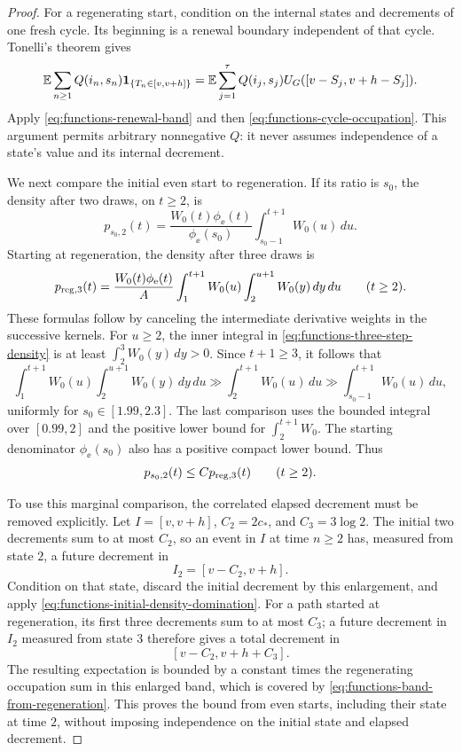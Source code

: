 \begin{proof}
For a regenerating start, condition on the internal states and
decrements of one fresh cycle.  Its beginning is a renewal boundary
independent of that cycle.  Tonelli's theorem gives
\[
 \mathbb E\sum_{n\ge1}Q(i_n,s_n)\mathbf 1_{\{T_n\in[v,v+h]\}}
 =
 \mathbb E\sum_{j=1}^{\tau}Q(i_j,s_j)
 U_G([v-S_j,v+h-S_j]).
\]
Apply \eqref{eq:functions-renewal-band} and then
\eqref{eq:functions-cycle-occupation}.
This argument permits arbitrary nonnegative \(Q\): it never
assumes independence of a state's value and its internal decrement.

We next compare the initial even start to regeneration.
If its ratio is \(s_0\), the density after two draws, on \(t\ge2\),
is
\begin{equation}\label{eq:functions-two-step-density}
 p_{s_0,2}(t)=
 \frac{W_0(t)\phi_\ee(t)}{\phi_\ee(s_0)}
 \int_{s_0-1}^{t+1}W_0(u)\,du.
\end{equation}
Starting at regeneration, the density after three draws is
\begin{equation}\label{eq:functions-three-step-density}
 p_{{\rm reg},3}(t)=
 \frac{W_0(t)\phi_\mathrm e(t)}A
 \int_1^{t+1}W_0(u)
       \int_2^{u+1}W_0(y)\,dy\,du
 \qquad(t\ge2).
\end{equation}
These formulas follow by canceling the intermediate derivative
weights in the successive kernels.
For \(u\ge2\), the inner integral in
\eqref{eq:functions-three-step-density} is at least
\(\int_2^3W_0(y)\,dy>0\).
Since \(t+1\ge3\), it follows that
\[
 \int_1^{t+1}W_0(u)\int_2^{u+1}W_0(y)\,dy\,du
 \gg \int_2^{t+1}W_0(u)\,du
 \gg \int_{s_0-1}^{t+1}W_0(u)\,du,
\]
uniformly for \(s_0\in[1.99,2.3]\).
The last comparison uses the bounded integral over
\([0.99,2]\) and the positive lower bound for
\(\int_2^{t+1}W_0\).
The starting denominator \(\phi_\ee(s_0)\) also has a positive
compact lower bound.  Thus
\begin{equation}\label{eq:functions-initial-density-domination}
 p_{s_0,2}(t)\le C p_{{\rm reg},3}(t)\qquad(t\ge2).
\end{equation}

To use this marginal comparison, the correlated elapsed decrement
must be removed explicitly.  Let \(I=[v,v+h]\),
\(C_2=2c_*\), and \(C_3=3\log2\).
The initial two decrements sum to at most \(C_2\), so an event
in \(I\) at time \(n\ge2\) has, measured from state \(2\), a future
decrement in
\[
 I_2=[v-C_2,v+h].
\]
Condition on that state, discard the initial decrement by this
enlargement, and apply
\eqref{eq:functions-initial-density-domination}.
For a path started at regeneration, its first three decrements
sum to at most \(C_3\); a future decrement in \(I_2\) measured
from state \(3\) therefore gives a total decrement in
\[
 [v-C_2,v+h+C_3].
\]
The resulting expectation is bounded by a constant times the
regenerating occupation sum in this enlarged band, which is
covered by \eqref{eq:functions-band-from-regeneration}.
This proves the bound from even starts, including their state
at time \(2\), without imposing independence on the initial
state and elapsed decrement.


\end{proof}
